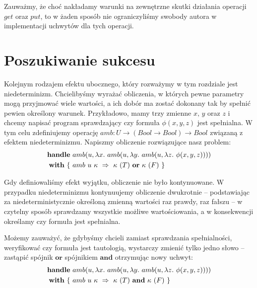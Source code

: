 Zauważmy, że choć nakładamy warunki na zewnętrzne skutki działania operacji \(get\) oraz \(put\), to w żaden sposób nie ograniczyliśmy swobody autora w implementacji uchwytów dla tych operacji. %


\section{Poszukiwanie sukcesu}


Kolejnym rodzajem efektu ubocznego, który rozważymy w tym rozdziale jest niedeterminizm. Chcielibyśmy wyrażać obliczenia, w których pewne parametry mogą przyjmować wiele wartości, a ich dobór ma zostać dokonany tak by spełnić pewien określony warunek. Przykładowo, mamy trzy zmienne \(x,\, y\) oraz \(z\) i chcemy napisać program sprawdzający czy formuła \(\phi(x, y, z)\) jest spełnialna. W tym celu zdefiniujemy operację \(amb: U \rightarrow (Bool \rightarrow Bool) \rightarrow \mathit{Bool}\) związaną z efektem niedeterminizmu. Napiszmy obliczenie rozwiązujące nasz problem:
\begin{equation}\begin{split}
  \handle{
    &\op{amb}{u}{\fun{x}{
        \op{amb}{u}{\fun{y}{
            \op{amb}{u}{\fun{z}{
                \phi(x, y, z)
            }}
        }}
    }}\\
  }{ \{ \ &\hcase{amb}{u\ \kappa}{ \kappa\ (T) \ \mathbf{or} \ \kappa\ (F) } \ \} }
\end{split}\end{equation}

Gdy definiowaliśmy efekt wyjątku, obliczenie nie było kontynuowane. W przypadku niedeterminizmu kontynuujemy obliczenie dwukrotnie -- podstawiając za niedeterministycznie określoną zmienną wartości raz prawdy, raz fałszu -- w czytelny sposób sprawdzamy wszystkie możliwe wartościowania, a w konsekwencji określamy czy formuła jest spełnialna.

Możemy zauważyć, że gdybyśmy chcieli zamiast sprawdzania spełnialności, weryfikować czy formuła jest tautologią, wystarczy zmienić tylko jedno słowo -- zastąpić spójnik \(\mathbf{or}\) spójnikiem \(\mathbf{and}\) otrzymując nowy uchwyt:
\begin{equation}\begin{split}
  \handle{
    &\op{amb}{u}{\fun{x}{
        \op{amb}{u}{\fun{y}{
            \op{amb}{u}{\fun{z}{
                \phi(x, y, z)
            }}
        }}
    }}\\
  }{ \{ \ &\hcase{amb}{u\ \kappa}{ \kappa\ (T) \ \mathbf{and} \ \kappa\ (F) } \ \} }
\end{split}\end{equation}

